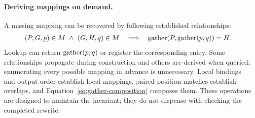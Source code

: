 \paragraph{Deriving mappings on demand.}
A missing mapping can be recovered by following established relationships:
\begin{equation}
\begin{aligned}
 (P,G,p)\in M\ \land\ (G,H,q)\in M
 \quad\Longrightarrow\quad
 \operatorname{gather}(P,\operatorname{gather}(p,q))=H.
\end{aligned}
\end{equation}
Lookup can return $\operatorname{gather}(p,q)$ or register the corresponding entry. Some
relationships propagate during construction and others are derived when
queried; enumerating every possible mapping in advance is unnecessary.
Local bindings and output order establish local mappings, paired position
matches establish overlaps, and Equation~\eqref{eq:gather-composition}
composes them. These operations are designed to maintain the invariant;
they do not dispense with checking the completed rewrite.
